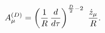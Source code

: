 \begin{equation}
A_{\mu}^{(D)}=\left({1 \over R}\, {d \over d\tau}\right)^{{D \over 2}-2}\,\,
{\dot{z}_{\mu} \over R}. \label{rec3}
\end{equation}


